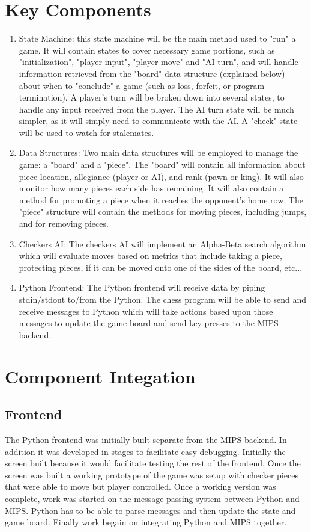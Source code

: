 \documentclass[]{article}
\begin{document}
\section*{Key Components}
\begin{enumerate}
\item State Machine: this state machine will be the main method used to "run" a game. It will contain states to cover necessary game portions, such as "initialization", "player input", "player move" and "AI turn", and will handle information retrieved from the "board" data structure (explained below) about when to "conclude" a game (such as loss, forfeit, or program termination). A player's turn will be broken down into several states, to handle any input received from the player. The AI turn state will be much simpler, as it will simply need to communicate with the AI. A "check" state will be used to watch for stalemates.

\item Data Structures: Two main data structures will be employed to manage the game: a "board" and a "piece". The "board" will contain all information about piece location, allegiance (player or AI), and rank (pawn or king). It will also monitor how many pieces each side has remaining. It will also contain a method for promoting a piece when it reaches the opponent's home row. The "piece" structure will contain the methods for moving pieces, including jumps, and for removing pieces. 

\item Checkers AI: The checkers AI will implement an Alpha-Beta search algorithm which will evaluate
moves based on metrics that include taking a piece, protecting pieces, if it can be moved onto one
of the sides of the board, etc...
 
\item Python Frontend: The Python frontend will receive data by piping stdin/stdout to/from the Python.
The chess program will be able to send and receive messages to Python which will take actions based upon
those messages to update the game board and send key presses to the MIPS backend.
\end{enumerate}

\section*{Component Integation}
\subsection*{Frontend}The Python frontend was initially built separate from the MIPS backend. In addition it was developed in stages to facilitate easy debugging. Initially the screen built because it would facilitate testing the rest of the frontend. Once the screen was built a working prototype of the game was setup with checker pieces that were able to move but player controlled. Once a working version was complete, work was started on the message passing system between Python and MIPS. Python has to be able to parse messages and then update the state and game board. Finally work begain on integrating Python and MIPS together.
\end{document}
